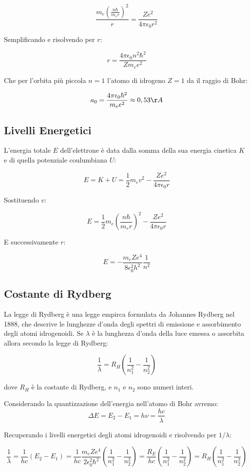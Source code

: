 \documentclass[12pt,a4paper]{report}
\begin{document}
\[ \frac{m_e \left(\frac{n \hbar}{m_e r}\right)^2}{r} = \frac{Ze^2}{4 \pi \epsilon_0 r^2} \]

Semplificando e risolvendo per \(r\):

\[ r = \frac{4 \pi \epsilon_0 n^2 \hbar^2}{Zm_e e^2} \]

Che per l'orbita più piccola \(n = 1\) l'atomo di idrogeno \(Z = 1\) da il raggio di Bohr:

\[ a_0 = \frac{4 \pi \epsilon_0 \hbar^2}{m_e e^2} \approx 0,53 \AA \]

\subsection{Livelli Energetici}

L'energia totale \(E\) dell'elettrone è data dalla somma della sua energia cinetica \(K\) e di quella potenziale coulumbiana \(U\):

\[ E = K + U = \frac{1}{2} m_e v^2 - \frac{Ze^2}{4 \pi \epsilon_0 r} \]

Sostituendo \(v\):

\[ E = \frac{1}{2} m_e \left(\frac{n \hbar}{m_e r}\right)^2 - \frac{Ze^2}{4 \pi \epsilon_0 r} \]

E successivamente \(r\):

\[ E = - \frac{m_e Z e^4}{8 \epsilon_0^2 h^2} \frac{1}{n^2} \]

\subsection{Costante di Rydberg}

La legge di Rydberg è una legge empirca formulata da Johannes Rydberg nel 1888, che descrive le lunghezze d'onda degli spettri di emissione e assorbimento degli atomi idrogenoidi. Se \(\lambda\) è la lunghezza d'onda della luce emessa o assorbita allora secondo la legge di Rydberg:

\[ \frac{1}{\lambda} = R_H \left( \frac{1}{n_1^2} - \frac{1}{n_2^2} \right) \]

dove \(R_H\) è la costante di Rydberg, e \(n_1\) e \(n_2\) sono numeri interi.

Considerando la quantizzazione dell'energia nell'atomo di Bohr avremo:
\[\Delta E = E_2 - E_1 = h\nu = \frac{hc}{\lambda}\]

Recuperando i livelli energetici degli atomi idrogenoidi e risolvendo per \(1/\lambda\):

\[\frac{1}{\lambda}=\frac{1}{hc}\left(E_2 - E_1\right) 
    = \frac{1}{hc} \frac{m_e Z e^4}{2 \epsilon_0^2 \hbar^2}\left(\frac{1}{n_1^2} - \frac{1}{n_2^2}\right)
    = \frac{R_E}{hc}\left(\frac{1}{n_1^2} - \frac{1}{n_2^2}\right) = R_H\left(\frac{1}{n_1^2} - \frac{1}{n_2^2}\right) \]
\end{document}
